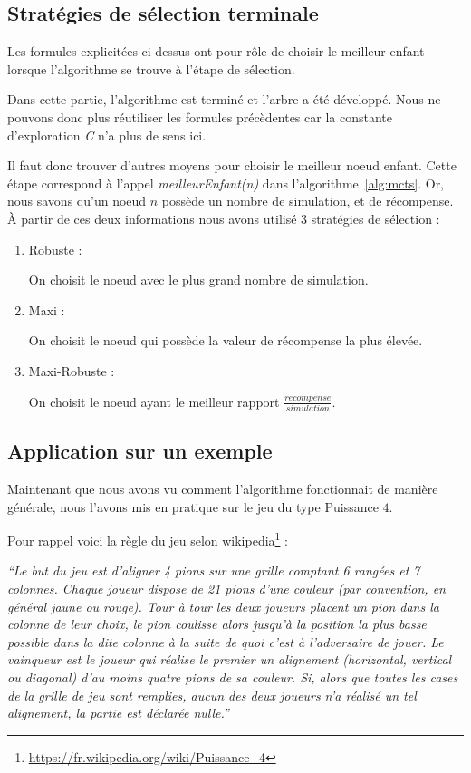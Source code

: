 \documentclass[pdftex,french, english]{article}	%
\begin{document}
	\subsection{Stratégies de sélection terminale}
	Les formules explicitées ci-dessus ont pour rôle de choisir le meilleur enfant lorsque l'algorithme se trouve à l'étape de sélection. 

	Dans cette partie, l'algorithme est terminé et l'arbre a été développé. Nous ne pouvons donc plus réutiliser les formules précèdentes car la constante d'exploration \textit{C} n'a plus de sens ici. 

Il faut donc trouver d'autres moyens pour choisir le meilleur noeud enfant. 
Cette étape correspond à l'appel \textit{meilleurEnfant(n)} dans l'algorithme~\ref{alg:mcts}. 
Or, nous savons qu'un noeud $n$ possède un nombre de simulation, et de récompense.
	À partir de ces deux informations nous avons utilisé 3 stratégies de sélection :
	\begin{enumerate}
		\item Robuste :
		
		On choisit le noeud avec le plus grand nombre de simulation.
		\item Maxi :  
		
		On choisit le noeud qui possède la valeur de récompense la plus élevée.
		\item Maxi-Robuste :
		
		On choisit le noeud ayant le meilleur rapport $\frac{recompense}{simulation}$.
	\end{enumerate}
    
    
    
    
    
	\subsection{Application sur un exemple}
	Maintenant que nous avons vu comment l'algorithme fonctionnait de manière générale, nous l'avons mis en pratique sur le jeu du type Puissance $4$. 
    

    Pour rappel voici la règle du jeu selon wikipedia\footnote{\url{https://fr.wikipedia.org/wiki/Puissance_4}} :
   
    \begin{displayquote}
    \textit{``Le but du jeu est d'aligner 4 pions sur une grille comptant 6 rangées et 7 colonnes. Chaque joueur dispose de 21 pions d'une couleur (par convention, en général jaune ou rouge). Tour à tour les deux joueurs placent un pion dans la colonne de leur choix, le pion coulisse alors jusqu'à la position la plus basse possible dans la dite colonne à la suite de quoi c'est à l'adversaire de jouer. Le vainqueur est le joueur qui réalise le premier un alignement (horizontal, vertical ou diagonal) d'au moins quatre pions de sa couleur. Si, alors que toutes les cases de la grille de jeu sont remplies, aucun des deux joueurs n'a réalisé un tel alignement, la partie est déclarée nulle.''}
   	\end{displayquote}
\end{document}
